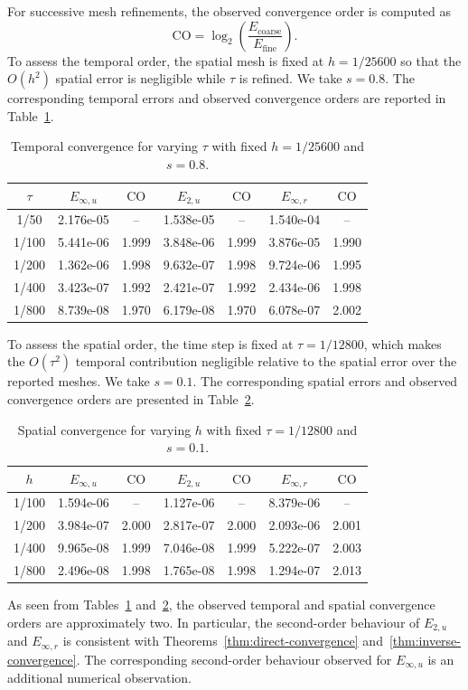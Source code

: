 \documentclass[reqno]{amsart}
\begin{document}
For successive mesh refinements, the observed convergence order is computed
as
\[
\mathrm{CO}
=
\log_2\left(\frac{E_{\mathrm{coarse}}}
{E_{\mathrm{fine}}}\right).
\]
To assess the temporal order, the spatial mesh is fixed at $h=1/25600$ so that the $O(h^2)$ spatial error is negligible while $\tau$ is refined. We take $s=0.8$. The corresponding temporal errors and observed
convergence orders are reported in Table~\ref{tab:integration-tau}.

\begin{table}[H]
\centering
\caption{Temporal convergence for varying $\tau$ with fixed $h=1/25600$ and $s=0.8$.}
\label{tab:integration-tau}
\begin{tabular}{c|c|c|c|c|c|c}
\hline
$\tau$ & $E_{\infty,u}$  & $\mathrm{CO}$ & $E_{2,u}$ & $\mathrm{CO}$  & $E_{\infty,r}$ & $\mathrm{CO}$ \\
\hline
1/50  &2.176e-05 &--&1.538e-05&--&1.540e-04&--\\
1/100 &5.441e-06&1.999&3.848e-06&1.999&3.876e-05&1.990\\
1/200 &1.362e-06&1.998&9.632e-07&1.998& 9.724e-06&1.995\\
1/400 &3.423e-07&1.992&2.421e-07&1.992&2.434e-06&1.998\\
1/800 &8.739e-08&1.970&6.179e-08&1.970&6.078e-07&2.002\\
\hline
\end{tabular}
\end{table}

To assess the spatial order, the time step is fixed at $\tau=1/12800$, which makes the $O(\tau^2)$ temporal contribution negligible relative to the spatial error over the reported meshes. We take $s=0.1$. The corresponding spatial errors and observed convergence orders are
presented in Table~\ref{tab:integration-h}.
\begin{table}[H]
\centering
\caption{Spatial convergence for varying $h$ with fixed $\tau=1/12800$ and $s=0.1$.}
\label{tab:integration-h}
\begin{tabular}{c|c|c|c|c|c|c}
\hline
$h$ & $E_{\infty,u}$ & $\mathrm{CO}$  & $E_{2,u}$ & $\mathrm{CO}$  & $E_{\infty,r}$ & $\mathrm{CO}$ \\
\hline
1/100 &1.594e-06&--&1.127e-06&--&8.379e-06&--\\
1/200 &3.984e-07&2.000&2.817e-07&2.000&2.093e-06&2.001\\
1/400 &9.965e-08&1.999&7.046e-08&1.999&5.222e-07&2.003\\
1/800 &2.496e-08&1.998&1.765e-08&1.998&1.294e-07&2.013\\
\hline
\end{tabular}
\end{table}
As seen from Tables~\ref{tab:integration-tau}
and~\ref{tab:integration-h}, the observed temporal and spatial
convergence orders are approximately two. In particular, the
second-order behaviour of $E_{2,u}$ and $E_{\infty,r}$ is consistent
with Theorems~\ref{thm:direct-convergence}
and~\ref{thm:inverse-convergence}. The corresponding second-order
behaviour observed for $E_{\infty,u}$ is an additional numerical
observation.
\end{document}
